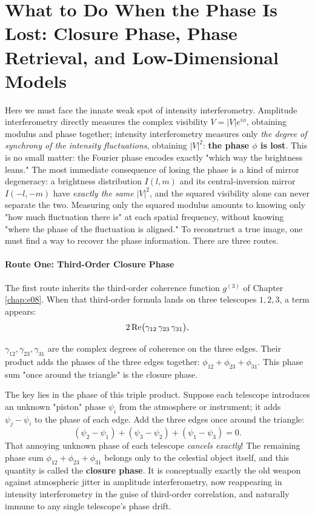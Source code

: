 \section{What to Do When the Phase Is Lost: Closure Phase, Phase Retrieval, and Low-Dimensional Models}
\label{sec:e11-phase}

Here we must face the innate weak spot of intensity interferometry. Amplitude interferometry directly measures the complex visibility \(V=|V|e^{i\phi}\), obtaining modulus and phase together; intensity interferometry measures only \emph{the degree of synchrony of the intensity fluctuations}, obtaining \(|V|^2\): \textbf{the phase \(\phi\) is lost}. This is no small matter: the Fourier phase encodes exactly "which way the brightness leans." The most immediate consequence of losing the phase is a kind of mirror degeneracy: a brightness distribution \(I(l,m)\) and its central-inversion mirror \(I(-l,-m)\) have \emph{exactly the same} \(|V|^2\), and the squared visibility alone can never separate the two. Measuring only the squared modulus amounts to knowing only "how much fluctuation there is" at each spatial frequency, without knowing "where the phase of the fluctuation is aligned." To reconstruct a true image, one must find a way to recover the phase information. There are three routes.

\paragraph{Route One: Third-Order Closure Phase}
\label{sec:e11-closure}

The first route inherits the third-order coherence function \(g^{(3)}\) of Chapter \ref{chap:e08}. When that third-order formula lands on three telescopes \(1,2,3\), a term appears:
\begin{equation}
  2\,{\rm Re}\big(\gamma_{12}\,\gamma_{23}\,\gamma_{31}\big),
  \label{eq:e11-triple}
\end{equation}
\begin{formulaexplain}
\(\gamma_{12},\gamma_{23},\gamma_{31}\) are the complex degrees of coherence on the three edges. Their product adds the phases of the three edges together: \(\phi_{12}+\phi_{23}+\phi_{31}\). This phase sum "once around the triangle" is the closure phase.
\end{formulaexplain}
The key lies in the phase of this triple product. Suppose each telescope introduces an unknown "piston" phase \(\psi_i\) from the atmosphere or instrument; it adds \(\psi_j-\psi_i\) to the phase of each edge. Add the three edges once around the triangle:
\[
  (\psi_2-\psi_1)+(\psi_3-\psi_2)+(\psi_1-\psi_3)=0.
\]
That annoying unknown phase of each telescope \emph{cancels exactly}! The remaining phase sum \(\phi_{12}+\phi_{23}+\phi_{31}\) belongs only to the celestial object itself, and this quantity is called the \textbf{closure phase}. It is conceptually exactly the old weapon against atmospheric jitter in amplitude interferometry, now reappearing in intensity interferometry in the guise of third-order correlation, and naturally immune to any single telescope's phase drift.

